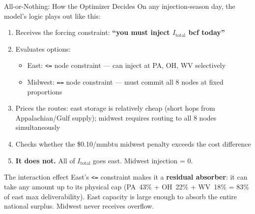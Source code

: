\documentclass[aspectratio=169, 11pt]{beamer}
\begin{document}
\begin{frame}{All-or-Nothing: How the Optimizer Decides}
  On any injection-season day, the model's logic plays out like this:

  \vspace{0.5em}
  \begin{enumerate}
    \item Receives the forcing constraint: \textbf{``you must inject $I_\text{total}$ bcf today''}
    \item Evaluates options:
      \begin{itemize}
        \item East: \texttt{<=} node constraint --- can inject at PA, OH, WV selectively
        \item Midwest: \texttt{==} node constraint --- must commit all 8 nodes at fixed proportions
      \end{itemize}
    \item Prices the routes: east storage is relatively cheap (short hops from Appalachian/Gulf supply); midwest requires routing to all 8 nodes simultaneously
    \item Checks whether the \$0.10/mmbtu midwest penalty exceeds the cost difference
    \item[\alert{5.}] \alert{\textbf{It does not.}} All of $I_\text{total}$ goes east. Midwest injection = 0.
  \end{enumerate}

  \vspace{0.3em}
  \begin{block}{The interaction effect}
    East's \texttt{<=} constraint makes it a \textbf{residual absorber}: it can take any amount up to its physical cap (PA~43\% + OH~22\% + WV~18\% = 83\% of east max deliverability).
    East capacity is large enough to absorb the entire national surplus.
    Midwest never receives overflow.
  \end{block}
\end{frame}
\end{document}
